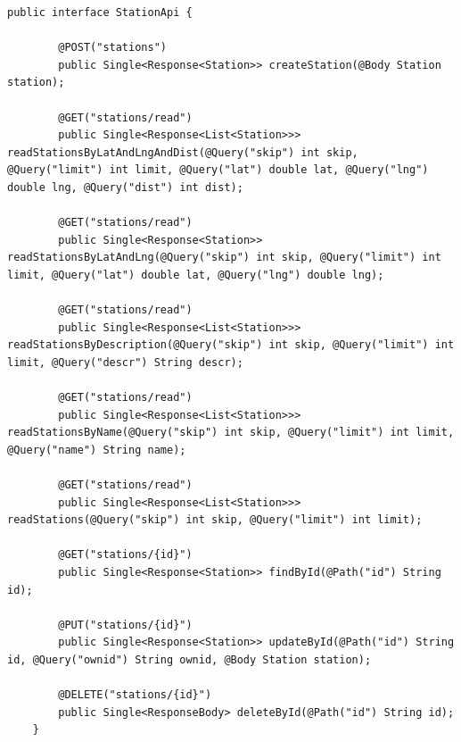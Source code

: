 \begin{lstlisting}[label=list:android_api_station,caption=Plik \texttt{main/java/com/example/testapp/api/api/StationApi.java},basicstyle=\tiny\ttfamily]
    public interface StationApi {

        @POST("stations")
        public Single<Response<Station>> createStation(@Body Station station);
    
        @GET("stations/read")
        public Single<Response<List<Station>>> readStationsByLatAndLngAndDist(@Query("skip") int skip, @Query("limit") int limit, @Query("lat") double lat, @Query("lng") double lng, @Query("dist") int dist);
    
        @GET("stations/read")
        public Single<Response<Station>> readStationsByLatAndLng(@Query("skip") int skip, @Query("limit") int limit, @Query("lat") double lat, @Query("lng") double lng);
    
        @GET("stations/read")
        public Single<Response<List<Station>>> readStationsByDescription(@Query("skip") int skip, @Query("limit") int limit, @Query("descr") String descr);
    
        @GET("stations/read")
        public Single<Response<List<Station>>> readStationsByName(@Query("skip") int skip, @Query("limit") int limit, @Query("name") String name);
    
        @GET("stations/read")
        public Single<Response<List<Station>>> readStations(@Query("skip") int skip, @Query("limit") int limit);
    
        @GET("stations/{id}")
        public Single<Response<Station>> findById(@Path("id") String id);
    
        @PUT("stations/{id}")
        public Single<Response<Station>> updateById(@Path("id") String id, @Query("ownid") String ownid, @Body Station station);
    
        @DELETE("stations/{id}")
        public Single<ResponseBody> deleteById(@Path("id") String id);
    }
\end{lstlisting}

